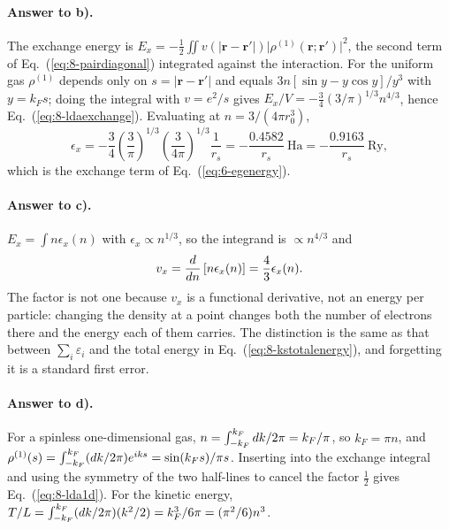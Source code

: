 \paragraph{Answer to b).}
The exchange energy is
$E_x=-\tfrac12\iint v(\vert\bm{r}-\bm{r}'\vert)
\vert\rho^{(1)}(\bm{r};\bm{r}')\vert^2$, the second term of
Eq.~(\ref{eq:8-pairdiagonal}) integrated against the interaction.  For the
uniform gas $\rho^{(1)}$ depends only on $s=\vert\bm{r}-\bm{r}'\vert$ and
equals $3n[\sin y-y\cos y]/y^3$ with $y=k_Fs$; doing the integral with
$v=e^2/s$ gives $E_x/V=-\tfrac34(3/\pi)^{1/3}n^{4/3}$, hence
Eq.~(\ref{eq:8-ldaexchange}).  Evaluating at $n=3/(4\pi r_0^3)$,
\begin{equation}
  \epsilon_x = -\frac{3}{4}\left(\frac{3}{\pi}\right)^{1/3}
    \left(\frac{3}{4\pi}\right)^{1/3}\frac{1}{r_s}
   = -\frac{0.4582}{r_s}\ \text{Ha}
   = -\frac{0.9163}{r_s}\ \text{Ry},
  \label{eq:8-exb3}
\end{equation}
which is the exchange term of Eq.~(\ref{eq:6-egenergy}).

\paragraph{Answer to c).}
$E_x=\int n\epsilon_x(n)$ with $\epsilon_x\propto n^{1/3}$, so the integrand
is $\propto n^{4/3}$ and
\begin{equation}
  v_x = \frac{d}{dn}\left[n\epsilon_x(n)\right]
      = \frac{4}{3}\epsilon_x(n).
  \label{eq:8-exc3}
\end{equation}
The factor is not one because $v_x$ is a functional derivative, not an energy
per particle: changing the density at a point changes both the number of
electrons there and the energy each of them carries.  The distinction is the
same as that between $\sum_i\varepsilon_i$ and the total energy in
Eq.~(\ref{eq:8-kstotalenergy}), and forgetting it is a standard first error.

\paragraph{Answer to d).}
For a spinless one-dimensional gas, $n=\int_{-k_F}^{k_F}dk/2\pi=k_F/\pi$,
so $k_F=\pi n$, and
$\rho^{(1)}(s)=\int_{-k_F}^{k_F}(dk/2\pi)e^{iks}=\sin(k_Fs)/\pi s$.
Inserting into the exchange integral and using the symmetry of the two
half-lines to cancel the factor $\tfrac12$ gives Eq.~(\ref{eq:8-lda1d}).  For
the kinetic energy,
$T/L=\int_{-k_F}^{k_F}(dk/2\pi)(k^2/2)=k_F^3/6\pi=(\pi^2/6)n^3$.

